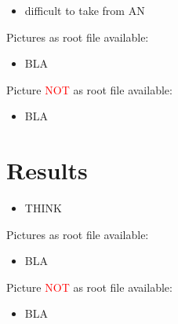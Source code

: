 \begin{itemize}
\item difficult to take from AN
\end{itemize}

Pictures as root file available:
\begin{itemize}
\item BLA
\end{itemize}

Picture \textcolor{red}{NOT} as root file available:
\begin{itemize}
\item BLA
\end{itemize}

\chapter{Results}

\begin{itemize}
\item THINK
\end{itemize}

Pictures as root file available:
\begin{itemize}
\item BLA
\end{itemize}

Picture \textcolor{red}{NOT} as root file available:
\begin{itemize}
\item BLA
\end{itemize}

